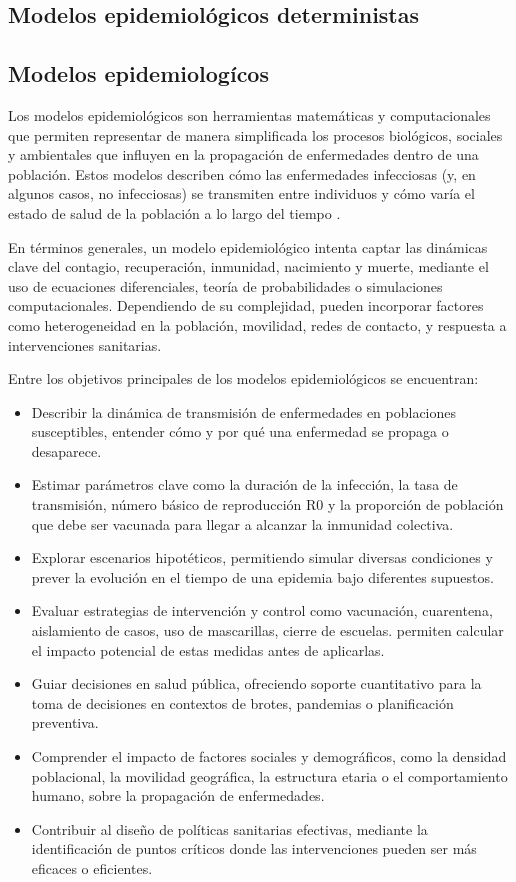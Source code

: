 \begin{enumerate}
\section{Modelos epidemiológicos  deterministas}

\subsection{Modelos epidemiologícos}
Los modelos epidemiológicos son herramientas matemáticas y computacionales que permiten representar de manera simplificada los procesos biológicos, sociales y ambientales que influyen en la propagación de enfermedades dentro de una población. Estos modelos describen cómo las enfermedades infecciosas (y, en algunos casos, no infecciosas) se transmiten entre individuos y cómo varía el estado de salud de la población a lo largo del tiempo \cite{ferrero2021modelos}.

En términos generales, un modelo epidemiológico intenta captar las dinámicas clave del contagio, recuperación, inmunidad, nacimiento y muerte, mediante el uso de ecuaciones diferenciales, teoría de probabilidades o simulaciones computacionales. Dependiendo de su complejidad, pueden incorporar factores como heterogeneidad en la población, movilidad, redes de contacto, y respuesta a intervenciones sanitarias.

Entre los objetivos principales de los modelos epidemiológicos se encuentran:
\begin{itemize}
    \item Describir la dinámica de transmisión de enfermedades en poblaciones susceptibles, entender cómo y por qué una enfermedad se propaga o desaparece.
    \item Estimar parámetros clave como la duración de la infección, la tasa de transmisión, número básico de reproducción R0 y la proporción de población que debe ser vacunada para llegar a alcanzar la inmunidad colectiva.
    \item Explorar escenarios hipotéticos, permitiendo simular diversas condiciones y prever la evolución en el tiempo de una epidemia bajo diferentes supuestos.
    \item Evaluar estrategias de intervención y control como vacunación, cuarentena, aislamiento de casos, uso de mascarillas, cierre de escuelas. permiten calcular el impacto potencial de estas medidas antes de aplicarlas.
    \item Guiar decisiones en salud pública, ofreciendo soporte cuantitativo para la toma de decisiones en contextos de brotes, pandemias o planificación preventiva.
    \item Comprender el impacto de factores sociales y demográficos, como la densidad poblacional, la movilidad geográfica, la estructura etaria o el comportamiento humano, sobre la propagación de enfermedades.
    \item Contribuir al diseño de políticas sanitarias efectivas, mediante la identificación de puntos críticos donde las intervenciones pueden ser más eficaces o eficientes.
\end{itemize}


\end{enumerate}
